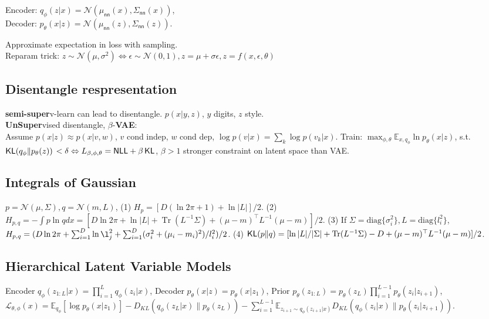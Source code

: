 Encoder: \(q_{\phi}(z | x) = \mathcal{N}(\mu_{\mathsf{nn}}(x), \Sigma_{\mathsf{nn}}(x))\), \\
Decoder: \(p_{\theta}(x | z) = \mathcal{N}(\mu_{\mathsf{nn}}(z), \Sigma_{\mathsf{nn}}(z))\).

Approximate expectation in loss with sampling.\\
Reparam trick: \(z \sim \mathcal{N}(\mu, \sigma^{2}) \Leftrightarrow \epsilon \sim \mathcal{N}(0,1), z=\mu+\sigma \epsilon, z=f(x, \epsilon, \theta)\) 


\subsection*{Disentangle respresentation}
\textbf{semi-super}v-learn can lead to disentangle. \(p(x|y, z)\), \(y\) digits, \(z\) style. \\
\textbf{UnSuper}vised disentangle, \(\beta\)-\textbf{VAE}: \\
Assume \(p({x} | {z}) \approx p({x} | {v}, {w})\), \(v\) cond indep, \(w\) cond dep, \(\log p({v} | {x}) = \sum_{k} \log p(v_{k} | {x})\). Train: 
\(\max _{\phi, \theta} \mathbb{E}_{x,q_{\phi}} \ln p_{\theta}(x | z)\), s.t. \(\operatorname{\mathsf{KL}}(q_{\phi} \| p_{\theta}(z))\) \(<\delta\Leftrightarrow L_{\beta,\phi,\theta}=\mathsf{NLL}+\beta \operatorname{\mathsf{KL}}\), \(\beta > 1\) stronger constraint on latent space than VAE.


\subsection*{Integrals of Gaussian}
\(p=\mathcal{N}(\mu, \Sigma),q=\mathcal{N}(m, L)\), (1) \(H_p = [D (\ln 2 \pi+1) + \ln |L|] /2\). 
(2) \(H_{p, q} = -\int p \ln q d x = [D \ln 2 \pi + \ln |L|+ \operatorname{Tr}(L^{-1}\Sigma) + (\mu-m)^{\top}L^{-1}(\mu-m)] /2\).
(3) If \(\Sigma = \text{diag}\{\sigma^2_i\},L = \text{diag}\{l^2_i\}\), \(H_{p, q} = (D\ln 2\pi + \sum_{i=1}^{D}\ln \l^2_j +  \sum_{i=1}^{D}(\sigma_i^2 + (\mu_i - m_i)^2) / l_i^2 )/2\).
(4) \(\operatorname{\mathsf{KL}}(p\|q) = [\ln |L|/|\Sigma|+ \operatorname{Tr}(L^{-1}\Sigma) - D + (\mu-m)^{\top}L^{-1}(\mu-m)] /2\).


\subsection*{Hierarchical Latent Variable Models}
Encoder \(q_{\phi}(z_{1:L}| x)= \prod_{i=1}^{L}q_{\phi}(z_{i} | x) \),
Decoder  \(p_{\theta}(x|z) = p_{\theta}(x|z_1)\),
Prior \(p_{\theta}(z_{1:L})=p_{\theta}(z_{L}) \prod_{i=1}^{L-1} p_{\theta}(z_{i} | z_{i+1})\),
\(\mathcal{L}_{\theta, \phi}(x)=\mathbb{E}_{q_{\phi}}[\log p_{\theta}(x | z_{1})]-D_{K L}(q_{\phi}(z_{L} | x) \| p_{\theta}(z_{L}))-\sum_{i=1}^{L-1} \mathbb{E}_{z_{i+1} \sim q_{\phi}(z_{i+1} | x)} D_{K L}(q_{\phi}(z_{i} | x) \| p_{\theta}(z_{i} | z_{i+1}))\).
